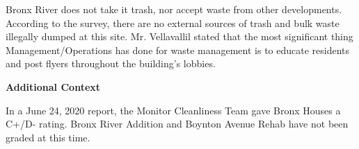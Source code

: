 Bronx River does not take it trash, nor accept waste from other developments. According to the survey, there are no external sources of trash and bulk waste illegally dumped at this site. Mr. Vellavallil stated that the most significant thing Management/Operations has done for waste management is to educate residents and post flyers throughout the building's lobbies.

\textbf{Additional Context}  

In a June 24, 2020 report, the Monitor Cleanliness Team gave Bronx Houses a C+/D- rating.  Bronx River Addition and Boynton Avenue Rehab have not been graded at this time. 